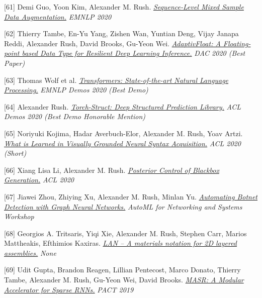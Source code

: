 \documentclass[10pt]{article}
\begin{document}
\medskip


[61] \ind Demi Guo, Yoon Kim, Alexander M. Rush. \emph{\href{ https://www.aclweb.org/anthology/2020.emnlp-main.447/ }{ Sequence-Level Mixed Sample Data Augmentation.} }\emph{ EMNLP 2020 }

\medskip


[62] \ind Thierry Tambe, En-Yu Yang, Zishen Wan, Yuntian Deng, Vijay Janapa Reddi, Alexander Rush, David Brooks, Gu-Yeon Wei. \emph{\href{ https://arxiv.org/pdf/1909.13271 }{ AdaptivFloat: A Floating-point based Data Type for Resilient Deep Learning Inference.} }\emph{ DAC 2020 (Best Paper) }

\medskip


[63] \ind Thomas Wolf et al. \emph{\href{ https://arxiv.org/pdf/1910.03771 }{ Transformers: State-of-the-art Natural Language Processing.} }\emph{ EMNLP Demos 2020 (Best Demo) }

\medskip


[64] \ind Alexander Rush. \emph{\href{ https://arxiv.org/pdf/2002.00876 }{ Torch-Struct: Deep Structured Prediction Library.} }\emph{ ACL Demos 2020 (Best Demo Honorable Mention) }

\medskip


[65] \ind Noriyuki Kojima, Hadar Averbuch-Elor, Alexander M. Rush, Yoav Artzi. \emph{\href{ https://arxiv.org/pdf/2005.01678 }{ What is Learned in Visually Grounded Neural Syntax Acquisition.} }\emph{ ACL 2020  (Short) }

\medskip


[66] \ind Xiang Lisa Li, Alexander M. Rush. \emph{\href{ https://arxiv.org/pdf/2005.04560 }{ Posterior Control of Blackbox Generation.} }\emph{ ACL 2020 }

\medskip


[67] \ind Jiawei Zhou, Zhiying Xu, Alexander M. Rush, Minlan Yu. \emph{\href{ https://arxiv.org/pdf/2003.06344 }{ Automating Botnet Detection with Graph Neural Networks.} }\emph{ AutoML for Networking and Systems Workshop }

\medskip


[68] \ind Georgios A. Tritsaris, Yiqi Xie, Alexander M. Rush, Stephen Carr, Marios Mattheakis, Efthimios Kaxiras. \emph{\href{ https://arxiv.org/pdf/1910.03413 }{ LAN -- A materials notation for 2D layered assemblies.} }\emph{ None }

\medskip


[69] \ind Udit Gupta, Brandon Reagen, Lillian Pentecost, Marco Donato, Thierry Tambe, Alexander M. Rush, Gu-Yeon Wei, David Brooks. \emph{\href{ None }{ MASR: A Modular Accelerator for Sparse RNNs.} }\emph{ PACT 2019 }
\end{document}
